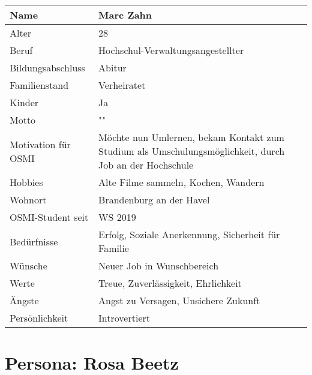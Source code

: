 \documentclass{article}
\begin{document}
\begin{tabularx}{\textwidth}{|l|X|}
	\hline
	Name                & Marc Zahn                                           \\
	\hline
	Alter               & 28                                                  \\
	\hline
	Beruf               & Hochschul-Verwaltungsangestellter                   \\
	\hline
	Bildungsabschluss   & Abitur                                              \\
	\hline
	Familienstand       & Verheiratet                                         \\
	\hline
	Kinder              & Ja                                                  \\
	\hline
	Motto               & ""                                                  \\
	\hline
	Motivation für OSMI & Möchte nun Umlernen, bekam Kontakt zum Studium als
	Umschulungsmöglichkeit, durch Job an der Hochschule                       \\
	\hline
	Hobbies             & Alte Filme sammeln, Kochen, Wandern                 \\
	\hline
	Wohnort             & Brandenburg an der Havel                            \\
	\hline
	OSMI-Student seit   & WS 2019                                             \\
	\hline
	Bedürfnisse         & Erfolg, Soziale Anerkennung, Sicherheit für Familie \\
	\hline
	Wünsche             & Neuer Job in Wunschbereich                          \\
	\hline
	Werte               & Treue, Zuverlässigkeit, Ehrlichkeit                 \\
	\hline
	Ängste              & Angst zu Versagen, Unsichere Zukunft                \\
	\hline
	Persönlichkeit      & Introvertiert                                       \\
	\hline
\end{tabularx}

\newpage

\section{Persona: Rosa Beetz}
\end{document}
